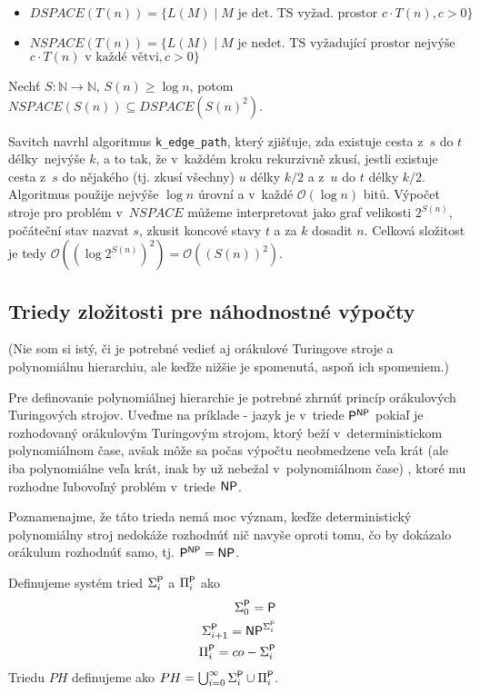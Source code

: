 \begin{itemize}
    \item $DSPACE(T(n)) = \{ L(M) \mid \text{$M$ je det. TS vyžad.
        prostor } c \cdot T(n), c > 0 \}$
    \item $NSPACE(T(n)) = \{ L(M) \mid \text{$M$ je nedet. TS vyžadující
        prostor nejvýše}$ $c \cdot T(n) \text{ v~každé větvi}, c > 0 \}$
\end{itemize}

\begin{theorem}[Savitch]
    Nechť $S : \mathbb{N} \to \mathbb{N}$, $S(n) \geq \log n$,
    potom $NSPACE(S(n)) \subseteq DSPACE(S(n)^2)$.
\end{theorem}

Savitch navrhl algoritmus \verb|k_edge_path|,
který zjišťuje, zda existuje cesta z~$s$ do $t$ délky~nejvýše $k$, a to
tak, že v~každém kroku rekurzivně zkusí, jestli existuje cesta z~$s$ do
nějakého (tj. zkusí všechny) $u$ délky $k/2$ a z~$u$ do $t$ délky $k/2$.
Algoritmus použije nejvýše $\log n$ úrovní a v~každé
$\mathcal{O}(\log n)$ bitů.
Výpočet stroje pro problém v~$NSPACE$ můžeme interpretovat jako graf
velikosti $2^{S(n)}$, počáteční stav nazvat $s$, zkusit koncové stavy
$t$ a za $k$ dosadit $n$. Celková složitost je tedy
$\mathcal{O}((\log 2^{S(n)})^2) = \mathcal{O}((S(n))^2)$.

\subsection{Triedy zložitosti pre náhodnostné výpočty}

(Nie som si istý, či je potrebné vedieť aj orákulové Turingove stroje
a polynomiálnu hierarchiu, ale keďže nižšie je spomenutá, aspoň ich spomeniem.)

Pre definovanie polynomiálnej hierarchie je potrebné zhrnúť princíp
orákulových Turingových strojov. Uveďme na príklade - jazyk je v~triede
$\P^{\NP}$ pokiaľ je rozhodovaný orákulovým Turingovým strojom,
ktorý beží v~deterministickom polynomiálnom čase, avšak môže sa počas
výpočtu neobmedzene veľa krát (ale iba polynomiálne veľa krát, inak by
už nebežal v~polynomiálnom čase) , ktoré mu 
rozhodne ľubovoľný problém v~triede $\NP$.

Poznamenajme, že táto trieda nemá moc význam, keďže deterministický polynomiálny
stroj nedokáže rozhodnúť nič navyše oproti tomu, čo by dokázalo
orákulum rozhodnúť samo, tj. $\P^{\NP} = \NP$.

\begin{definition}
	Definujeme systém tried $\Sigma_i^\P$ a $\Pi_i^\P$ ako
	\begin{align*}
		\Sigma_0^\P = \P \\
		\Sigma_{i+1}^{\P} = \NP^{\Sigma_i^{\P}} \\
		\Pi_i^{\P} = co-\Sigma_i^{\P}
	\end{align*}
	Triedu $PH$ definujeme ako $PH=\bigcup_{i=0}^{\infty} \Sigma_i^\P \cup \Pi_i^\P$.
\end{definition}

